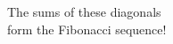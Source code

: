 \documentclass[preview]{standalone}
\begin{document}
\begin{center}
The sums of these diagonals \\ form the Fibonacci sequence!
\end{center}
\end{document}
